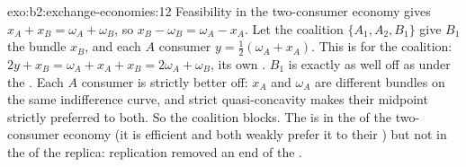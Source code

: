 \begin{solution}{exo:b2:exchange-economies:12}
Feasibility in the two-consumer economy gives $x_A + x_B = \omega_A + \omega_B$, so $x_B - \omega_B =
\omega_A - x_A$. Let the coalition $\{A_1, A_2, B_1\}$ give $B_1$ the bundle $x_B$, and each $A$ consumer
$y = \tfrac12(\omega_A + x_A)$. This is  for the coalition: $2y + x_B = \omega_A + x_A + x_B =
2\omega_A + \omega_B$, its own . $B_1$ is exactly as well off as under the . Each $A$
consumer is strictly better off: $x_A$ and $\omega_A$ are different bundles on the same indifference
curve, and strict quasi-concavity makes their midpoint strictly preferred to both. So the coalition
blocks. The  is in the  of the two-consumer economy (it is efficient and both weakly
prefer it to their ) but not in the  of the replica: replication removed an end of the
.
\end{solution}

